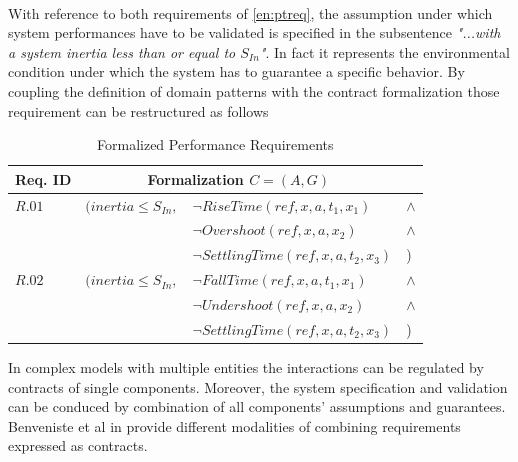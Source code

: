 \paragraph{} With reference to both requirements of \ref{en:ptreq}, the assumption under which system performances have to be validated is specified in the subsentence \textit{"...with a system inertia less than or equal to $S_{In}$"}. In fact it represents the environmental condition under which the system has to guarantee a specific behavior. By coupling the definition of domain patterns with the contract formalization those requirement can be restructured as follows
\begin{table}[h]
\centering
\begin{tabular}{|l|rll|}
  \hline \rule{0pt}{3ex}
Req. ID & \multicolumn{2}{c}{Formalization $C=(A,G)$} & \\
  \hline \rule{0pt}{3ex}
$R.01$ & $(inertia \leq S_{In} , $&$\neg RiseTime(ref,x,a,t_1,x_1) $&$\wedge$ \\ 
  & & $\neg Overshoot(ref,x,a,x_2) $&$\wedge$ \\
  & & $\neg SettlingTime(ref,x,a,t_2,x_3)$&) \\
  \hline \rule{0pt}{3ex}
$R.02$ & $(inertia \leq S_{In} , $&$\neg FallTime(ref,x,a,t_1,x_1) $&$\wedge$ \\ 
  & & $\neg Undershoot(ref,x,a,x_2) $&$\wedge$ \\
  & & $\neg SettlingTime(ref,x,a,t_2,x_3)$&) \\
  \hline 
\end{tabular}
\caption{Formalized Performance Requirements}
\end{table}

In complex models with multiple entities the interactions can be regulated by contracts of single components. Moreover, the system specification and validation can be conduced by combination of all components' assumptions and guarantees. Benveniste et al in \citep{benveniste2007multiple} provide different modalities of combining requirements expressed as contracts.

